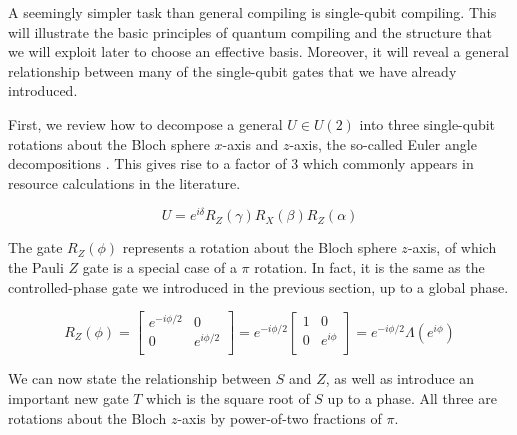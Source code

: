 A seemingly simpler task than general compiling is single-qubit compiling.
This will illustrate the basic principles of quantum compiling and the
structure that we will exploit later to choose an effective basis. Moreover,
it will reveal a general relationship between many of the single-qubit
gates that we have already introduced.

First, we review how to decompose a general $U \in U(2)$ into three single-qubit
rotations about the Bloch sphere $x$-axis and $z$-axis, the so-called
Euler angle decompositions \cite{Nielsen2000}. This gives rise to a factor of $3$
which commonly appears in resource calculations in the literature.

\begin{equation}
U = e^{i\delta}R_Z(\gamma)R_X(\beta)R_Z(\alpha)
\end{equation}

The gate $R_Z(\phi)$ represents a rotation about the Bloch sphere $z$-axis,
of which the Pauli $Z$ gate is a special case of a $\pi$ rotation. In fact,
it is the same as the controlled-phase gate we introduced in the previous section,
up to a global phase.

\begin{equation}
R_Z(\phi) =
\left[
  \begin{array}{cc}
    e^{-i\phi/2} & 0 \\
    0 & e^{i\phi/2} \\
  \end{array} \right]
=
e^{-i\phi / 2} \left[
  \begin{array}{cc}
    1 & 0 \\
    0 & e^{i\phi} \\
  \end{array} \right]
= e^{-i\phi / 2} \Lambda(e^{i\phi})
\end{equation}

We can now state the relationship between $S$ and $Z$, as well as introduce
an important new gate $T$ which is the square root of $S$ up to a phase. All three
are rotations about the Bloch $z$-axis by power-of-two fractions of $\pi$.

